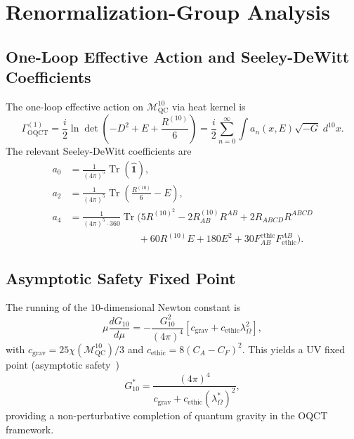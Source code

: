 \documentclass[12pt,a4paper]{article}
\theoremstyle{myrmk}
\newcommand{\Mmanifold}{\mathcal{M}^{10}_{\mathrm{QC}}}
\newcommand{\Tr}{\operatorname{Tr}}
\begin{document}
\section{Renormalization-Group Analysis}
\label{sec:rg}

\subsection{One-Loop Effective Action and Seeley-DeWitt Coefficients}

The one-loop effective action on $\Mmanifold$ via heat kernel is
\begin{equation}
  \Gamma^{(1)}_{\mathrm{OQCT}}
  = \frac{i}{2}\ln\det\!\left(-D^2+E+\frac{R^{(10)}}{6}\right)
  = \frac{i}{2}\sum_{n=0}^{\infty}\int a_n(x,E)\sqrt{-G}\;d^{10}x.
  \label{eq:one_loop}
\end{equation}
The relevant Seeley-DeWitt coefficients are
\begin{align}
  a_0 &= \frac{1}{(4\pi)^5}\Tr(\hat{\mathbf{1}}),\\
  a_2 &= \frac{1}{(4\pi)^5}\Tr\!\left(\frac{R^{(10)}}{6}-E\right),\\
  a_4 &= \frac{1}{(4\pi)^5\cdot360}\Tr\!\Big(
    5R^{(10)^2}-2R^{(10)}_{AB}R^{AB}
    +2R_{ABCD}R^{ABCD}\nonumber\\
    &\qquad\qquad\qquad\quad
    +60R^{(10)}E+180E^2+30F_{AB}^{\mathrm{ethic}}F^{AB}_{\mathrm{ethic}}
  \Big).
\end{align}

\subsection{Asymptotic Safety Fixed Point}

The running of the $10$-dimensional Newton constant is
\begin{equation}
  \mu\frac{dG_{10}}{d\mu}
  = -\frac{G_{10}^2}{(4\pi)^4}\!\left[c_{\mathrm{grav}}+c_{\mathrm{ethic}}\lambda_\Omega^2\right],
  \label{eq:g10_running}
\end{equation}
with $c_{\mathrm{grav}}=25\chi(\Mmanifold)/3$ and $c_{\mathrm{ethic}}=8(C_A-C_F)^2$.
This yields a UV fixed point (asymptotic safety~\cite{Reuter1998})
\begin{equation}
  G^*_{10} = \frac{(4\pi)^4}{c_{\mathrm{grav}}+c_{\mathrm{ethic}}(\lambda_\Omega^*)^2},
\end{equation}
providing a non-perturbative completion of quantum gravity in the OQCT framework.
\end{document}
